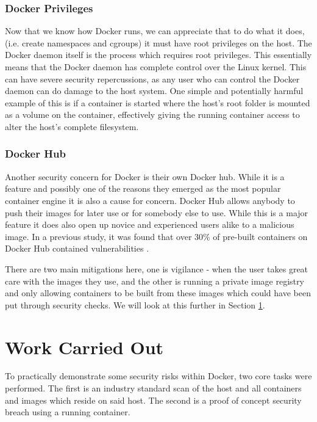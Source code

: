 \documentclass{article}
\begin{document}
\subsubsection{Docker Privileges}

Now that we know how Docker runs, we can appreciate that to do what it does, (i.e. create namespaces and cgroups) it must have root privileges on the host. The Docker daemon itself is the process which requires root privileges. This essentially means that the Docker daemon has complete control over the Linux kernel. This can have severe security repercussions, as any user who can control the Docker daemon can do damage to the host system. One simple and potentially harmful example of this is if a container is started where the host's root folder is mounted as a volume on the container, effectively giving the running container access to alter the host's complete filesystem.


\subsubsection{Docker Hub}

Another security concern for Docker is their own Docker hub. While it is a feature and possibly one of the reasons they emerged as the most popular container engine it is also a cause for concern. Docker Hub allows anybody to push their images for later use or for somebody else to use. While this is a major feature it does also open up novice and experienced users alike to a malicious image. In a previous study, it was found that over 30\% of pre-built containers on Docker Hub contained vulnerabilities \citep{Bettini2015}.

There are two main mitigations here, one is vigilance - when the user takes great care with the images they use, and the other is running a private image registry and only allowing containers to be built from these images which could have been put through security checks. We will look at this further in Section \ref{sec:Work}.

\newpage
\section{Work Carried Out}
\label{sec:Work}
To practically demonstrate some security risks within Docker, two core tasks were performed. The first is an industry standard scan of the host and all containers and images which reside on said host. The second is a proof of concept security breach using a running container. 
\end{document}
